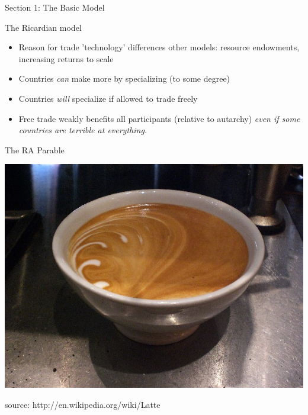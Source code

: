 \documentclass[ignorenonframetext,]{beamer}
\begin{document}
\begin{frame}

    Section 1: The Basic Model

\end{frame}

\begin{frame}{The Ricardian model}

    \begin{itemize}
        \item Reason for trade 'technology' differences {\footnotesize other models: resource endowments, increasing returns to scale}
        \item Countries \emph{can} make more by specializing (to some degree)
        \item Countries \emph{will} specialize if allowed to trade freely
        \item Free trade weakly benefits all participants (relative to autarchy) \emph{even if some countries are terrible at everything.}
    \end{itemize}

\end{frame}

\begin{frame}{The RA Parable}

    \begin{center}
        \includegraphics[scale=0.4]{latte.jpg}
    \end{center}

    {\tiny source: http://en.wikipedia.org/wiki/Latte}

\end{frame}
\end{document}
